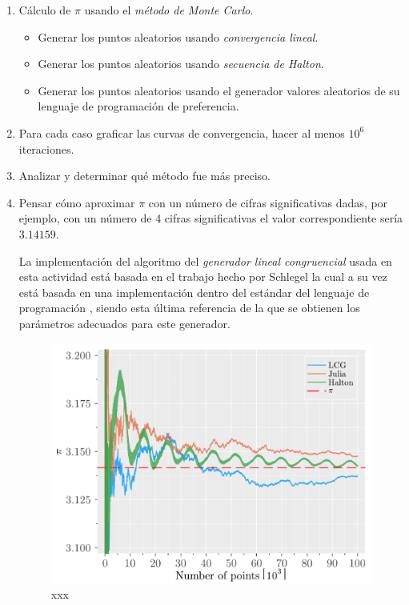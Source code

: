\begin{enumerate}
    \item Cálculo de $\pi$ usando el \textit{método de Monte Carlo}.
    \begin{itemize}
        \item Generar los puntos aleatorios usando \textit{convergencia lineal}.
        \item Generar los puntos aleatorios usando \textit{secuencia de Halton}.
        \item Generar los puntos aleatorios usando el generador valores aleatorios de su lenguaje de programación de preferencia.
    \end{itemize}

    \item Para cada caso graficar las curvas de convergencia, hacer al menos $10^6$ iteraciones.
    \item Analizar y determinar qué método fue más preciso.
    \item Pensar cómo aproximar $\pi$ con un número de cifras significativas dadas, por ejemplo, con un número de 4 cifras significativas el valor correspondiente sería $3.14159$.
    \begin{solution}
        La implementación del algoritmo del \textit{generador lineal congruencial} usada en esta actividad está basada en el trabajo hecho por Schlegel \cite{schlegel2008lcg} la cual a su vez está basada en una implementación dentro del estándar del lenguaje de programación  \cite{saucier2000computer}, siendo esta última referencia de la que se obtienen los parámetros adecuados para este generador.
        

        \begin{figure}[ht!]
            \centering
            \includegraphics[scale=0.5]{../figures/pi_estimation.pdf}
            \caption{xxx}
        \end{figure}
    \end{solution}
\end{enumerate}

